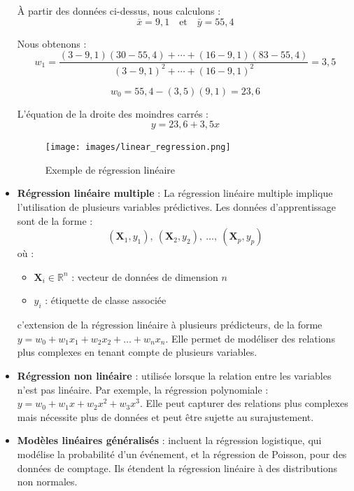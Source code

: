 \documentclass[a4paper,12pt]{report}
\begin{document}
\begin{itemize}
\begin{minipage}[t]{0.48\textwidth}
        À partir des données ci-dessus, nous calculons :
        \[
        \bar{x} = 9{,}1 \quad \text{et} \quad \bar{y} = 55{,}4
        \]
        
        Nous obtenons :
        \[
        w_1 = \frac{(3 - 9{,}1)(30 - 55{,}4) + \cdots + (16 - 9{,}1)(83 - 55{,}4)}{(3 - 9{,}1)^2 + \cdots + (16 - 9{,}1)^2} = 3{,}5
        \]
        
        \[
        w_0 = 55{,}4 - (3{,}5)(9{,}1) = 23{,}6
        \]
        
        L'équation de la droite des moindres carrés :
        \[
        y = 23{,}6 + 3{,}5x
        \]
        
        \end{minipage}
        
    
       \begin{figure}[h]
            \centering
            \texttt{[image: images/linear\_regression.png]}
            \caption{Exemple de régression linéaire}
            \label{fig:reg}
        \end{figure}

    \item \textbf{Régression linéaire multiple} :  La régression linéaire multiple implique l'utilisation de plusieurs variables prédictives.   Les données d'apprentissage sont de la forme :
    \[
    (\mathbf{X}_1, y_1),\ (\mathbf{X}_2, y_2),\ \dots,\ (\mathbf{X}_p, y_p)
    \]
    où :
    \begin{itemize}
        \item $\mathbf{X}_i \in \mathbb{R}^n$ : vecteur de données de dimension $n$
        \item $y_i$ : étiquette de classe associée
    \end{itemize}
    
    c'extension de la régression linéaire à plusieurs prédicteurs, de la forme \( y = w_0 + w_1 x_1 + w_2 x_2 + \dots + w_n x_n \). Elle permet de modéliser des relations plus complexes en tenant compte de plusieurs variables.

    \item \textbf{Régression non linéaire} : utilisée lorsque la relation entre les variables n’est pas linéaire. Par exemple, la régression polynomiale : \( y = w_0 + w_1 x + w_2 x^2 + w_3 x^3 \). Elle peut capturer des relations plus complexes mais nécessite plus de données et peut être sujette au surajustement.
  
    \item \textbf{Modèles linéaires généralisés} : incluent la régression logistique, qui modélise la probabilité d’un événement, et la régression de Poisson, pour des données de comptage. Ils étendent la régression linéaire à des distributions non normales.


\end{itemize}
\end{document}
